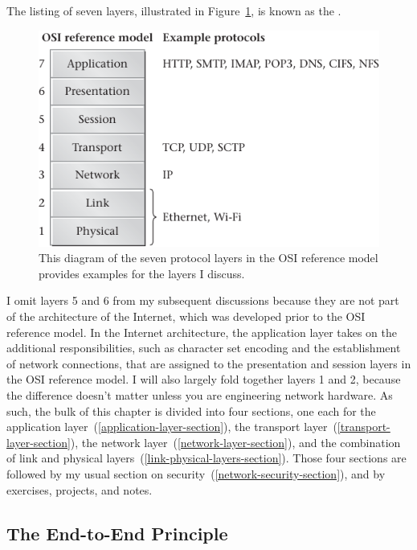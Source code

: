 The listing of seven layers, illustrated in Figure~\ref{scan-9-7}, is
known as the .
\begin{figure}
\centerline{\includegraphics{hail_f0903}}
\caption{This diagram of the seven protocol layers in the OSI
  reference model provides
  examples for the layers I discuss.}
\label{scan-9-7}
\end{figure}
I omit layers 5 and 6 from my subsequent discussions because they are
not part of the architecture of the Internet, which
was developed prior to the OSI reference model.  In the Internet
architecture, the application layer takes on the
additional responsibilities, such as character set
encoding and the establishment of network connections, that are
assigned to the presentation and session layers in the OSI reference
model.
I will also largely fold together layers 1
and 2, because the difference doesn't matter unless you are engineering
network hardware.  As such, the bulk of this chapter is divided into
four sections, one each for the application layer~(\ref{application-layer-section}), the transport
layer~(\ref{transport-layer-section}), the network layer~(\ref{network-layer-section}), and the combination of link and
physical layers~(\ref{link-physical-layers-section}).  Those four sections are followed by my usual
section on security~(\ref{network-security-section}), and by
exercises, projects, and notes.

\subsection{The End-to-End Principle}

